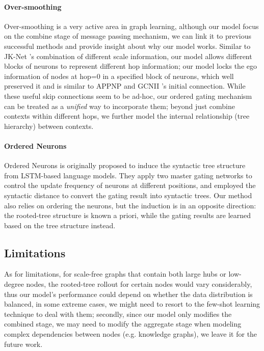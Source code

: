 \documentclass{article}
\begin{document}
\paragraph{Over-smoothing}
Over-smoothing is a very active area in graph learning, although our model focus on the combine stage of message passing mechanism, we can link it to previous successful methods and provide insight about why our model works. Similar to JK-Net \citep{xu2018representation}'s combination of different scale information, our model allows different blocks of neurons to represent different hop information; our model locks the ego information of nodes at hop=0 in a specified block of neurons, which well preserved it and is similar to APPNP \citep{klicpera2018predict} and GCNII \citep{chen2020simple}'s initial connection. While these useful skip connections seem to be ad-hoc, our ordered gating mechanism can be treated as a \textit{unified} way to incorporate them; beyond just combine contexts within different hops, we further model the internal relationship (tree hierarchy) between contexts.

\paragraph{Ordered Neurons}
Ordered Neurons \citep{shen2018ordered} is originally proposed to induce the syntactic tree structure from LSTM-based language models. They apply two master gating networks to control the update frequency of neurons at different positions, and employed the syntactic distance \citep{shen2018straight} to convert the gating result into syntactic trees. Our method also relies on ordering the neurons, but the induction is in an opposite direction: the rooted-tree structure is known a priori, while the gating results are learned based on the tree structure instead.

\subsection{Limitations}
As for limitations, for scale-free graphs that contain both large hubs or low-degree nodes, the rooted-tree rollout for certain nodes would vary considerably, thus our model's performance could depend on whether the data distribution is balanced, in some extreme cases, we might need to resort to the few-shot learning technique to deal with them; secondly, since our model only modifies the combined stage, we may need to modify the aggregate stage when modeling complex dependencies between nodes (e.g. knowledge graphs), we leave it for the future work.
\end{document}
